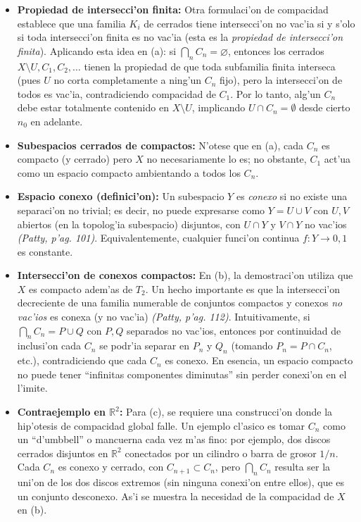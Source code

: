 \documentclass[a4paper,11pt]{article}  %
\begin{document}
\begin{enumerate}
\begin{itemize}
\item \textbf{Propiedad de intersecci'on finita:} Otra formulaci'on de compacidad establece que una familia ${K_i}$ de cerrados tiene intersecci'on no vac'ia si y s'olo si toda intersecci'on finita es no vac'ia (esta es la \emph{propiedad de intersecci'on finita}). Aplicando esta idea en (a): si $\bigcap_{n}C_n=\varnothing$, entonces los cerrados $X\setminus U, C_1, C_2,\dots$ tienen la propiedad de que toda subfamilia finita interseca (pues $U$ no corta completamente a ning'un $C_n$ fijo), pero la intersecci'on de todos es vac'ia, contradiciendo compacidad de $C_1$. Por lo tanto, alg'un $C_n$ debe estar totalmente contenido en $X\setminus U$, implicando $U\cap C_n=\emptyset$ desde cierto $n_0$ en adelante.
\item \textbf{Subespacios cerrados de compactos:} N'otese que en (a), cada $C_n$ es compacto (y cerrado) pero $X$ no necesariamente lo es; no obstante, $C_1$ act'ua como un espacio compacto ambientando a todos los $C_n$.
\item \textbf{Espacio conexo (definici'on):} Un subespacio $Y$ es \emph{conexo} si no existe una separaci'on no trivial; es decir, no puede expresarse como $Y=U\cup V$ con $U, V$ abiertos (en la topolog'ia subespacio) disjuntos, con $U\cap Y$ y $V\cap Y$ no vac'ios \emph{(Patty, p'ag. 101)}. Equivalentemente, cualquier funci'on continua $f: Y\to {0,1}$ es constante.
\item \textbf{Intersecci'on de conexos compactos:} En (b), la demostraci'on utiliza que $X$ es compacto adem'as de $T_2$. Un hecho importante es que la intersecci'on decreciente de una familia numerable de conjuntos compactos y conexos \emph{no vac'ios} es conexa (y no vac'ia) \emph{(Patty, p'ag. 112)}. Intuitivamente, si $\bigcap_n C_n = P\cup Q$ con $P,Q$ separados no vac'ios, entonces por continuidad de inclusi'on cada $C_n$ se podr'ia separar en $P_n$ y $Q_n$ (tomando $P_n=P\cap C_n$, etc.), contradiciendo que cada $C_n$ es conexo. En esencia, un espacio compacto no puede tener “infinitas componentes diminutas” sin perder conexi'on en el l'imite.
\item \textbf{Contraejemplo en $\mathbb{R}^2$:} Para (c), se requiere una construcci'on donde la hip'otesis de compacidad global falle. Un ejemplo cl'asico es tomar $C_n$ como un “d'umbbell” o mancuerna cada vez m'as fino: por ejemplo, dos discos cerrados disjuntos en $\mathbb{R}^2$ conectados por un cilindro o barra de grosor $1/n$. Cada $C_n$ es conexo y cerrado, con $C_{n+1}\subset C_n$, pero $\bigcap_n C_n$ resulta ser la uni'on de los dos discos extremos (sin ninguna conexi'on entre ellos), que es un conjunto desconexo. As'i se muestra la necesidad de la compacidad de $X$ en (b).

\end{itemize}
\end{enumerate}
\end{document}
